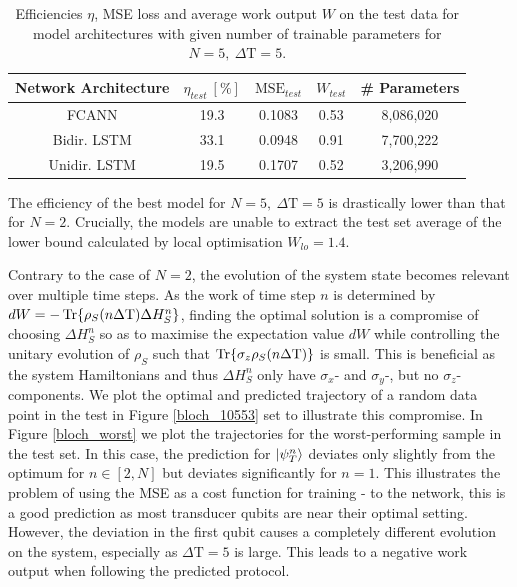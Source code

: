 \begin{table}[h]
	\centering
	\begin{tabular}{ c | c | c | c | c}
		Network Architecture & $\eta_{test} \ [\%]$ & $\mathrm{MSE}_{test}$ & $W_{test}$ & \# Parameters \\
		\hline
		FCANN        & 19.3 & 0.1083 & 0.53 & 8,086,020 \\
		Bidir. LSTM  & 33.1 & 0.0948 & 0.91 & 7,700,222 \\
		Unidir. LSTM & 19.5 & 0.1707 & 0.52 & 3,206,990\\
	\end{tabular}
	\caption{Efficiencies $\eta$, MSE loss and average work output $W$ on the test data for model architectures with given number of trainable parameters for $N=5, \ \Delta \mathrm{T} = 5$.}
	\label{n5efftable}
\end{table}

The efficiency of the best model for $N=5, \ \Delta \mathrm{T} = 5$ is drastically lower than that for $N=2$.
Crucially, the models are unable to extract the test set average of the lower bound calculated by local optimisation $W_{lo} = 1.4$.

Contrary to the case of $N=2$, the evolution of the system state becomes relevant over multiple time steps.
As the work of time step $n$ is determined by $dW = -\Tr{\rho_S(n \Delta \mathrm{T}) \Delta H^n_S}$, finding the optimal solution is a compromise of choosing $\Delta H^n_S$ so as to maximise the expectation value $dW$ while controlling the unitary evolution of $\rho_S$ such that $\Tr{\sigma_z \rho_S(n \Delta \mathrm{T})}$ is small.
This is beneficial as the system Hamiltonians and thus $\Delta H^n_S$ only have $\sigma_x$- and $\sigma_y$-, but no $\sigma_z$-components.
We plot the optimal and predicted trajectory of a random data point in the test in Figure \ref{bloch_10553} set to illustrate this compromise.
In Figure \ref{bloch_worst} we plot the trajectories for the worst-performing sample in the test set.
In this case, the prediction for $\ket{\psi_T^n}$ deviates only slightly from the optimum for $n \in [2, N]$ but deviates significantly for $n=1$.
This illustrates the problem of using the MSE as a cost function for training - to the network, this is a good prediction as most transducer qubits are near their optimal setting.
However, the deviation in the first qubit causes a completely different evolution on the system, especially as $\Delta \mathrm{T} = 5$ is large.
This leads to a negative work output when following the predicted protocol.

